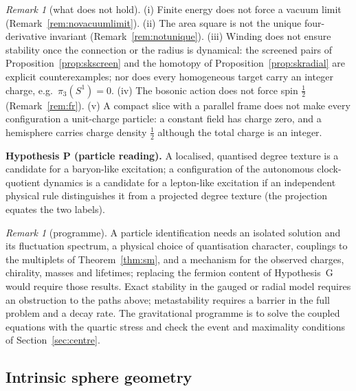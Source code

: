 \documentclass[aps,pra,onecolumn,superscriptaddress,nofootinbib,10pt]{revtex4-2}
\theoremstyle{definition}
\theoremstyle{remark}
\newtheorem{remark}[theorem]{Remark}
\begin{document}
\begin{remark}[what does not hold]\label{rem:sknogo}
(i) Finite energy does not force a vacuum limit (Remark~\ref{rem:novacuumlimit}).  (ii) The area square is not the
unique four-derivative invariant (Remark~\ref{rem:notunique}).  (iii) Winding does not ensure stability once the
connection or the radius is dynamical: the screened pairs of Proposition~\ref{prop:skscreen} and the homotopy of
Proposition~\ref{prop:skradial} are explicit counterexamples; nor does every homogeneous target carry an integer
charge, e.g.\ $\pi_3(S^1)=0$.  (iv) The bosonic action does not force spin $\tfrac12$ (Remark~\ref{rem:fr}).  (v) A compact
slice with a parallel frame does not make every configuration a unit-charge particle: a constant field has
charge zero, and a hemisphere carries charge density $\tfrac12$ although the total charge is an integer.
\end{remark}

\smallskip\noindent\textbf{Hypothesis P (particle reading).}  A localised, quantised degree texture is a candidate for a
baryon-like excitation; a configuration of the autonomous clock-quotient dynamics is a candidate for a
lepton-like excitation if an independent physical rule distinguishes it from a projected degree texture
(the projection equates the two labels).

\begin{remark}[programme]\label{rem:skprogramme}
A particle identification needs an isolated solution and its fluctuation spectrum, a physical choice of
quantisation character, couplings to the multiplets of Theorem~\ref{thm:sm}, and a mechanism for the observed
charges, chirality, masses and lifetimes; replacing the fermion content of Hypothesis~G would require
those results.  Exact stability in the gauged or radial model requires an obstruction to the paths above;
metastability requires a barrier in the full problem and a decay rate.  The gravitational programme is to
solve the coupled equations with the quartic stress and check the event and maximality conditions of
Section~\ref{sec:centre}.
\end{remark}

\subsection{Intrinsic sphere geometry}
\end{document}

